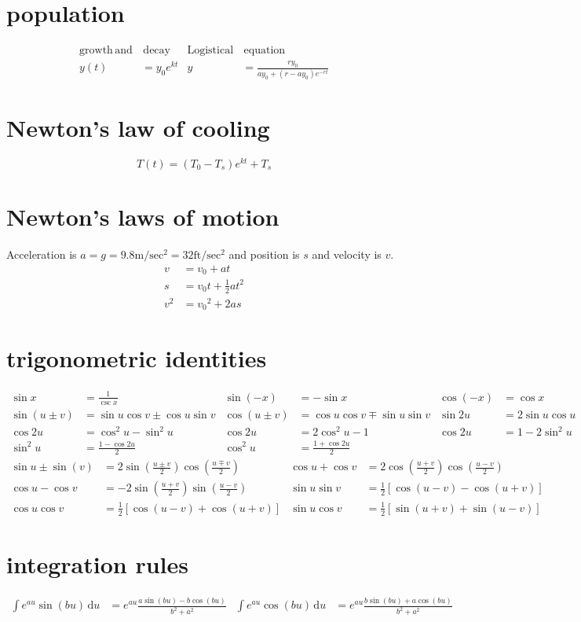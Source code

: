 \documentclass{article}
\begin{document}
\section*{population}
\begin{align*}
\mathrm{growth}\,\mathrm{and}&\,\mathrm{decay}&\mathrm{Logistical}&\,{}\mathrm{equation}\\
y(t)&=y_0 e^{kt}&y&=\frac{ry_0}{ay_0+(r-ay_0)e^{-rt}}
\end{align*}
\section*{Newton's law of cooling}
\[T(t)=\left(T_0-T_s\right)e^{kt}+T_s\]
\section*{Newton's laws of motion}
Acceleration is $a=g=9.8\mathrm{m/sec^2}=32\mathrm{ft/sec^2}$ and position is $s$ and velocity is $v$.
\begin{align*}
	v&=v_0+at\\
	s&=v_0t+\frac{1}{2}at^2\\
	v^2&={v_0}^2+2as
\end{align*}
\section*{trigonometric identities}
\begin{align*}
	\sin x&=\frac{1}{\csc x} & \sin(-x)&=-\sin x & \cos(-x)&=\cos x\\
	\sin(u\pm v)&=\sin u \cos v \pm \cos u \sin v & \cos(u \pm v)&=\cos u \cos v \mp \sin u \sin v & \sin 2u&=2\sin u \cos u\\
	\cos 2u&=\cos^2 u - \sin^2 u & \cos 2u&=2\cos^2 u - 1 & \cos 2u&=1 - 2\sin^2 u\\
	\sin^2 u&=\frac{1-\cos 2u}{2} & \cos^2 u&=\frac{1+\cos 2u}{2}
\end{align*}
\begin{align*}
	\sin u \pm \sin(v)&=2\sin\left(\frac{u\pm v}{2}\right)\cos\left(\frac{u \mp v}{2}\right) & \cos u + \cos v&=2\cos\left(\frac{u + v}{2}\right)\cos\left(\frac{u - v}{2}\right)\\
	\cos u - \cos v&=-2\sin\left(\frac{u + v}{2}\right)\sin\left(\frac{u - v}{2}\right) & \sin u\sin v&=\frac{1}{2}[\cos(u-v)-\cos(u+v)]\\
	\cos u\cos v&=\frac{1}{2}[\cos(u-v)+\cos(u+v)] & \sin u\cos v&=\frac{1}{2}[\sin(u+v)+\sin(u-v)]
\end{align*}
\section*{integration rules}
\begin{align*}
	\int{e^{au}\sin(bu)\,\mathrm{d}u}&=e^{au}\frac{a\sin(bu)-b\cos(bu)}{b^2+a^2} &
	\int{e^{au}\cos(bu)\,\mathrm{d}u}&=e^{au}\frac{b\sin(bu)+a\cos(bu)}{b^2+a^2}
\end{align*}
\end{document}
